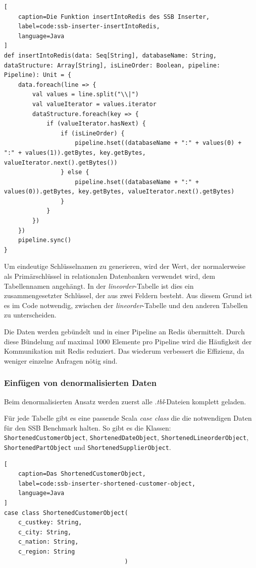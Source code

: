 \begin{lstlisting}[
    caption=Die Funktion insertIntoRedis des SSB Inserter,
    label=code:ssb-inserter-insertIntoRedis,
    language=Java
]
def insertIntoRedis(data: Seq[String], databaseName: String, dataStructure: Array[String], isLineOrder: Boolean, pipeline: Pipeline): Unit = {
	data.foreach(line => {
		val values = line.split("\\|")
		val valueIterator = values.iterator
		dataStructure.foreach(key => {
			if (valueIterator.hasNext) {
				if (isLineOrder) {
					pipeline.hset((databaseName + ":" + values(0) + ":" + values(1)).getBytes, key.getBytes, valueIterator.next().getBytes())
				} else {
					pipeline.hset((databaseName + ":" + values(0)).getBytes, key.getBytes, valueIterator.next().getBytes)
				}
			}
		})
	})
	pipeline.sync()
}
\end{lstlisting}

Um eindeutige Schlüsselnamen zu generieren, wird der Wert, der normalerweise als Primärschlüssel in relationalen Datenbanken verwendet wird, dem Tabellennamen angehängt. In der \emph{lineorder}-Tabelle ist dies ein zusammengesetzter Schlüssel, der aus zwei Feldern besteht. Aus diesem Grund ist es im Code notwendig, zwischen der \emph{lineorder}-Tabelle und den anderen Tabellen zu unterscheiden.

Die Daten werden gebündelt und in einer Pipeline an Redis übermittelt. Durch diese Bündelung auf maximal 1000 Elemente pro Pipeline wird die Häufigkeit der Kommunikation mit Redis reduziert. Das wiederum verbessert die Effizienz, da weniger einzelne Anfragen nötig sind.


\subsubsection{Einfügen von denormalisierten Daten}\label{sec:ssb-inserter-denormalized}
Beim denormalisierten Ansatz werden zuerst alle \emph{.tbl}-Dateien komplett geladen.

Für jede Tabelle gibt es eine passende Scala \emph{case class} die die notwendigen Daten für den SSB Benchmark halten.
So gibt es die Klassen:\\
\lstinline|ShortenedCustomerObject|, \lstinline|ShortenedDateObject|, \lstinline|ShortenedLineorderObject|, \\\lstinline|ShortenedPartObject| und \lstinline|ShortenedSupplierObject|.

\begin{lstlisting}[
    caption=Das ShortenedCustomerObject,
    label=code:ssb-inserter-shortened-customer-object,
    language=Java
]
case class ShortenedCustomerObject(
	c_custkey: String,
	c_city: String,
	c_nation: String,
	c_region: String
								  )
\end{lstlisting}


